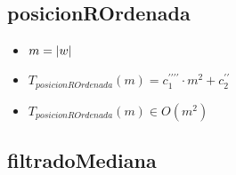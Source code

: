 \documentclass{article}
\begin{document}
    \subsection*{posicionROrdenada}

    \begin{minipage}{0.70\textwidth}
        
    \end{minipage}
    \hfill
    \begin{minipage}{0.25\textwidth}
    \end{minipage}

    \begin{itemize}
        \item $m = |w|$
        \item $T_{posicionROrdenada}(m) = c^{\prime\prime\prime\prime}_1 \cdot m^2 +
                                   c^{\prime\prime}_2 $
        \item $T_{posicionROrdenada}(m) \in O(m^{2})$
    \end{itemize}

    \subsection*{filtradoMediana}
\end{document}
